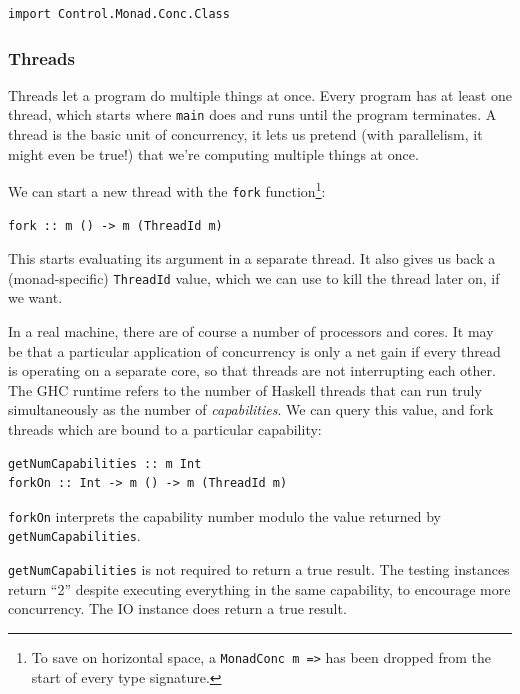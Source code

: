 \begin{verbatim}
import Control.Monad.Conc.Class
\end{verbatim}

\subsubsection*{Threads}
\label{sec:prelims-dejafu-conc-threads}

Threads let a program do multiple things at once. Every program has at
least one thread, which starts where \texttt{main} does and runs until
the program terminates. A thread is the basic unit of concurrency, it
lets us pretend (with parallelism, it might even be true!) that we're
computing multiple things at once.

We can start a new thread with the \texttt{fork} function\footnote{To
  save on horizontal space, a \texttt{MonadConc m =>} has been dropped
  from the start of every type signature.}:

\begin{verbatim}
fork :: m () -> m (ThreadId m)
\end{verbatim}

This starts evaluating its argument in a separate thread. It also
gives us back a (monad-specific) \texttt{ThreadId} value, which we can
use to kill the thread later on, if we want.

In a real machine, there are of course a number of processors and
cores. It may be that a particular application of concurrency is only
a net gain if every thread is operating on a separate core, so that
threads are not interrupting each other. The GHC runtime refers to the
number of Haskell threads that can run truly simultaneously as the
number of \textit{capabilities}. We can query this value, and fork
threads which are bound to a particular capability:

\begin{verbatim}
getNumCapabilities :: m Int
forkOn :: Int -> m () -> m (ThreadId m)
\end{verbatim}

\texttt{forkOn} interprets the capability number modulo the value
returned by \texttt{getNumCapabilities}.

\begin{departure}
  \texttt{getNumCapabilities} is not required to return a true
  result. The testing instances return ``2'' despite executing
  everything in the same capability, to encourage more
  concurrency. The IO instance does return a true result.
\end{departure}

